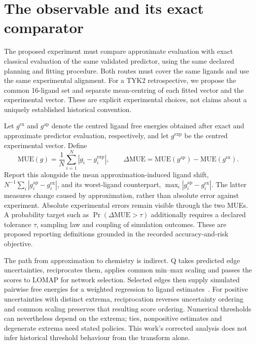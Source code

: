\documentclass{article}
\begin{document}
\section{The observable and its exact comparator}

The proposed experiment must compare approximate evaluation with exact classical evaluation of the same validated predictor, using the same declared planning and fitting procedure. Both routes must cover the same ligands and use the same experimental alignment. For a TYK2 retrospective, we propose the common 16-ligand set and separate mean-centring of each fitted vector and the experimental vector. These are explicit experimental choices, not claims about a uniquely established historical convention.

Let \(g^{\mathrm{ex}}\) and \(g^{\mathrm{ap}}\) denote the centred ligand free energies obtained after exact and approximate predictor evaluation, respectively, and let \(g^{\mathrm{exp}}\) be the centred experimental vector. Define
\[
\mathrm{MUE}(g)=\frac{1}{N}\sum_{i=1}^{N}|g_i-g_i^{\mathrm{exp}}|,
\qquad
\Delta\mathrm{MUE}=\mathrm{MUE}(g^{\mathrm{ap}})-\mathrm{MUE}(g^{\mathrm{ex}}).
\]
Report this alongside the mean approximation-induced ligand shift, \(N^{-1}\sum_i|g_i^{\mathrm{ap}}-g_i^{\mathrm{ex}}|\), and its worst-ligand counterpart, \(\max_i|g_i^{\mathrm{ap}}-g_i^{\mathrm{ex}}|\). The latter measures change caused by approximation, rather than absolute error against experiment. Absolute experimental errors remain visible through the two MUEs. A probability target such as \(\Pr(\Delta\mathrm{MUE}>\tau)\) additionally requires a declared tolerance \(\tau\), sampling law and coupling of simulation outcomes. These are proposed reporting definitions grounded in the recorded accuracy-and-risk objective.

The path from approximation to chemistry is indirect. Q takes predicted edge uncertainties, reciprocates them, applies common min--max scaling and passes the scores to LOMAP for network selection. Selected edges then supply simulated pairwise free energies for a weighted regression to ligand estimates~\cite{Q}. For positive uncertainties with distinct extrema, reciprocation reverses uncertainty ordering and common scaling preserves that resulting score ordering. Numerical thresholds can nevertheless depend on the extrema; ties, nonpositive estimates and degenerate extrema need stated policies. This work's corrected analysis does not infer historical threshold behaviour from the transform alone.
\end{document}
